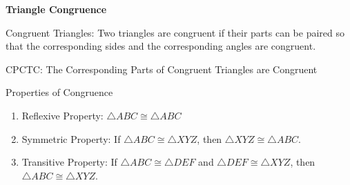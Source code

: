 \begin{center}
\textbf{Triangle Congruence 
}
\end{center}

\vspce

Congruent Triangles: Two triangles are congruent if their parts can be paired so that the corresponding sides and the corresponding angles are congruent. 

\vspce 

CPCTC: The Corresponding Parts of Congruent Triangles are Congruent  

\vspce 

Properties of Congruence
\begin{enumerate}[label = \arabic*. ]
\item \hspce Reflexive Property: $\triangle ABC \cong \triangle ABC$
\item \hspce Symmetric Property: If $\triangle ABC \cong \triangle XYZ$, then $\triangle XYZ \cong \triangle ABC$. 
\item \hspce Transitive Property: If $\triangle ABC \cong \triangle DEF$ and $\triangle DEF \cong \triangle XYZ$, then $\triangle ABC \cong \triangle XYZ$. 
\end{enumerate} 


